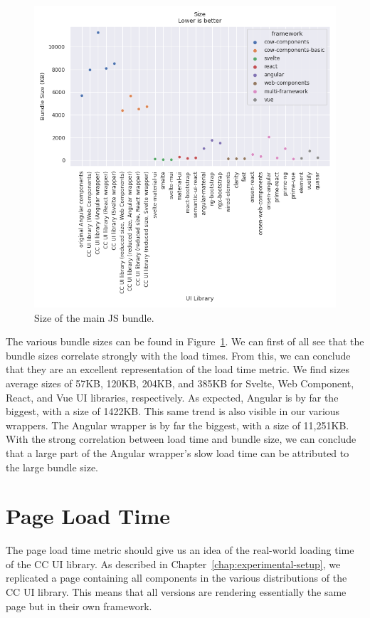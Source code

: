 \begin{figure}[h]
  \includegraphics[width=\columnwidth]{plots/size.png}
  \caption{Size of the main JS bundle.}
  \label{fig:results:size}
  \centering
\end{figure}


The various bundle sizes can be found in Figure~\ref{fig:results:size}. We can first of all see that the bundle sizes correlate strongly with the load times. From this, we can conclude that they are an excellent representation of the load time metric. We find sizes average sizes of 57KB, 120KB, 204KB, and 385KB for Svelte, Web Component, React, and Vue UI libraries, respectively. As expected, Angular is by far the biggest, with a size of 1422KB. This same trend is also visible in our various wrappers. The Angular wrapper is by far the biggest, with a size of 11,251KB. With the strong correlation between load time and bundle size, we can conclude that a large part of the Angular wrapper's slow load time can be attributed to the large bundle size.

\section{Page Load Time}
The page load time metric should give us an idea of the real-world loading time of the CC UI library. As described in Chapter~\ref{chap:experimental-setup}, we replicated a page containing all components in the various distributions of the CC UI library. This means that all versions are rendering essentially the same page but in their own framework.

